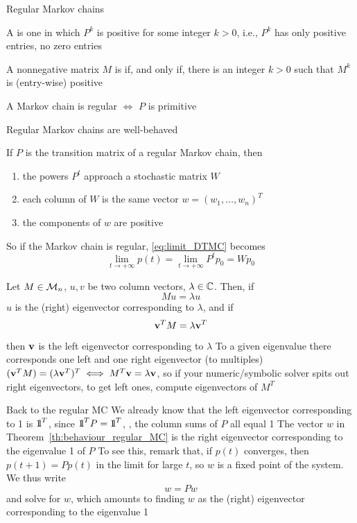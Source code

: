 \documentclass[aspectratio=169]{beamer}
\begin{document}
\begin{frame}{Regular Markov chains}
\begin{definition}
A  is one in which $P^k$ is positive for some integer $k>0$, i.e., $P^k$ has only positive entries, no zero entries
\end{definition}
\vfill
\begin{definition}
A nonnegative matrix $M$ is  if, and only if, there is an integer $k>0$ such that $M^k$ is (entry-wise) positive
\end{definition}
\vfill
\begin{theorem}
A Markov chain is regular $\iff$ $P$ is primitive
\end{theorem}
\end{frame}

\begin{frame}{Regular Markov chains are well-behaved}
\begin{theorem}\label{th:behaviour_regular_MC}
If $P$ is the transition matrix of a regular Markov chain, then
\begin{enumerate}
\item the powers $P^t$ approach a stochastic matrix $W$
\item each column of $W$ is the same vector $w=(w_1,\ldots,w_n)^T$
\item the components of $w$ are positive
\end{enumerate}
\end{theorem}
\vfill
So if the Markov chain is regular, \eqref{eq:limit_DTMC} becomes
\[
\lim_{t\rightarrow +\infty}p(t)=\lim_{t\rightarrow +\infty}P^tp_0
=Wp_0
\]
\end{frame}

\begin{frame} 
Let $M\in\mathcal{M}_n$, $u,v$ be two column vectors, $\lambda\in\mathbb{C}$. Then, if  
\[
Mu=\lambda u
\]
$u$ is the (right) eigenvector corresponding to $\lambda$, and if
\[
\mathbf{v}^TM=\lambda \mathbf{v}^T
\]
then $\mathbf{v}$ is the left eigenvector corresponding to $\lambda$
\vfill 
To a given eigenvalue there corresponds one left and one right eigenvector (to multiples)
\vfill
$(\mathbf{v}^TM)=(\lambda \mathbf{v}^T)^T\iff M^T\mathbf{v}=\lambda \mathbf{v}$, so if your numeric/symbolic solver spits out right eigenvectors, to get left ones, compute eigenvectors of $M^T$
\end{frame}

\begin{frame}{Back to the regular MC}
We already know that the left eigenvector corresponding to 1 is $\nbOne^T$, since $\nbOne^TP=\nbOne^T$, \ie, the column sums of $P$ all equal 1
\vfill
The vector $w$ in Theorem~\ref{th:behaviour_regular_MC} is the right eigenvector corresponding to the eigenvalue 1 of $P$
\vfill
To see this, remark that, if $p(t)$ converges, then $p(t+1)=Pp(t)$ in the limit for large $t$, so $w$ is a fixed point of the system. We thus write
\[
w=Pw
\]
and solve for $w$, which amounts to finding $w$ as the (right) eigenvector corresponding to the eigenvalue 1
\end{frame}
\end{document}
